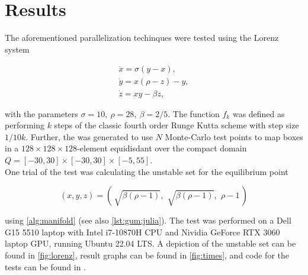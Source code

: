 
\section{Results}

The aforementioned parallelization techinques were tested using the Lorenz system 
\cite*{lorenz}

\begin{gather}
    \dot{x} = \sigma (y - x), \\
    \dot{y} = x (\rho - z) - y, \\
    \dot{z} = xy - \beta z,
\end{gather}

with the parameters $\sigma = 10,\ \rho = 28,\ \beta = 2 / 5$. The function $f_k$ was 
defined as performing $k$ steps of the classic fourth order Runge Kutta scheme 
\cite*{Runge, Kutta} with step 
size $1 / 10 k$. Further, the   was generated to use $N$
Monte-Carlo test points to map boxes in a $128 \times 128 \times 128$-element equidisdant 
 over the compact domain 
$Q = [-30,30] \times [-30,30] \times [-5,55]$. \\

One trial of the test was calculating the unstable set for the equilibrium point 

\begin{equation}
    \label{eq:equilibrium}
    (x, y, z) = \left(\,\sqrt{\beta (\rho - 1)},\,\ \sqrt{\beta (\rho - 1)},\,\ \rho - 1\,\right)
\end{equation}

using \autoref{alg:manifold} (see also \autoref{lst:gum:julia}). The test was performed on 
a Dell G15 5510 laptop with Intel i7-10870H CPU and Nividia GeForce RTX 3060 laptop GPU, 
running Ubuntu 22.04 LTS. A depiction of the unstable set can be found in \autoref{fig:lorenz}, 
result graphs can be found in \autoref{fig:times}, and code for the tests can be found 
in \cite*{benchmarks}. \\

